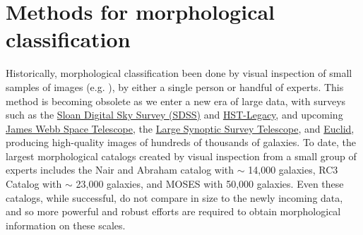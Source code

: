 \section{Methods for morphological classification}

Historically, morphological classification been done by visual inspection of small samples of images (e.g. \citet{Hubble1926,Sandage1961,DeVaucouleurs1963,Block1994,Eskridge2002,Buta2010}), by either a single person or handful of experts. This method is becoming obsolete as we enter a new era of large data, with surveys such as the \href{www.sdss.org}{Sloan Digital Sky Survey (SDSS)} and \href{https://hla.stsci.edu/}{HST-Legacy}, and upcoming \href{https://www.jwst.nasa.gov/}{James Webb Space Telescope}, the \href{https://www.lsst.org/}{Large Synoptic Survey Telescope}, and \href{https://www.euclid-ec.org/}{Euclid}, producing high-quality images of hundreds of thousands of galaxies. To date, the largest morphological catalogs created by visual inspection from a small group of experts includes the Nair and Abraham catalog \citep{Nair2010} with $\sim$ 14,000 galaxies, RC3 Catalog \citep{RC31991} with $\sim$ 23,000 galaxies, and MOSES \citep{Schawinski2007} with 50,000 galaxies. Even these catalogs, while successful, do not compare in size to the newly incoming data, and so more powerful and robust efforts are required to obtain morphological information on these scales.


